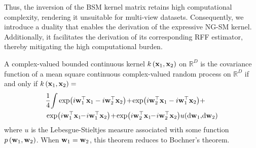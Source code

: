 Thus, the inversion of the BSM kernel matrix retains high computational complexity, rendering it unsuitable for multi-view datasets. Consequently, we introduce a duality that enables the derivation of the expressive NG-SM kernel. Additionally, it facilitates the derivation of its corresponding RFF estimator, thereby mitigating the high computational burden. 


\begin{theorem} 
\label{theo:Uni_Bochner}
A complex-valued bounded continuous kernel \( k\left({\mathbf x}_1, {\mathbf x}_2\right) \) on \( \mathbb{R}^D \) is the covariance function of a mean square continuous complex-valued random process on  \( \mathbb{R}^D \) if and only if $k\left({\mathbf x}_1, {\mathbf x}_2\right)=$
\begin{equation}
\setlength{\abovedisplayskip}{5pt}
\setlength{\belowdisplayskip}{5.5pt}
\begin{aligned}
& \frac{1}{4}\!\int 
 \exp(i\w_1^{\top} \x_1- i\w_2 ^{\top}\x_2)\!+\!\exp(i\w_2^{\top} \x_1 - i\w_1^{\top} \x_2) + \nonumber \\ &
 \exp(i\w_1^{\top}\x_1\!\!-\!i \w_1^{\top}\x_2)\!+\!\exp(i\w_2^{\top}\x_1\!\!-\!i\w_2^{\top}\x_2) u(\mathrm{d}\w_1,\!\mathrm{d} \w_2)
\end{aligned}
\end{equation}
where \( u \) is the Lebesgue-Stieltjes measure associated with some function \( p\left({\mathbf w}_1, {\mathbf w}_2\right) \). When \({\mathbf w}_1 = {\mathbf w}_2\), this theorem reduces to Bochner's theorem. 
\vspace{-.1in}
\end{theorem}

